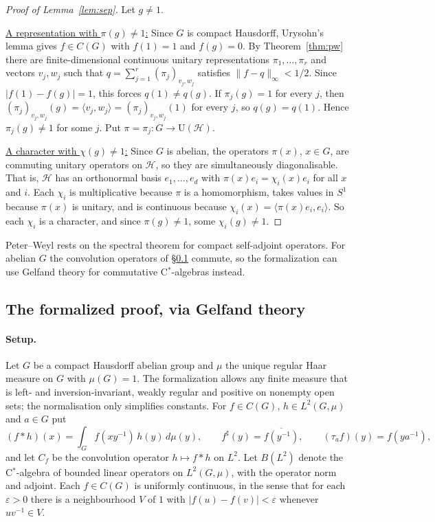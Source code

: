 \documentclass[11pt]{article}
\begin{document}
\begin{proof}[Proof of Lemma~\ref{lem:sep}]
Let $g \neq 1$.

\uline{A representation with $\pi(g) \neq 1$:} Since $G$ is compact Hausdorff, Urysohn's lemma gives $f \in C(G)$ with $f(1) = 1$ and $f(g) = 0$. By Theorem~\ref{thm:pw} there are finite-dimensional continuous unitary representations $\pi_1, \dots, \pi_r$ and vectors $v_j, w_j$ such that $q = \sum_{j=1}^r (\pi_j)_{v_j,w_j}$ satisfies $\|f - q\|_\infty < 1/2$. Since $|f(1) - f(g)| = 1$, this forces $q(1) \neq q(g)$.
If $\pi_j(g) = 1$ for every $j$, then $(\pi_j)_{v_j,w_j}(g) = \langle v_j, w_j\rangle = (\pi_j)_{v_j,w_j}(1)$ for every $j$, so $q(g) = q(1)$. Hence $\pi_j(g) \neq 1$ for some $j$. Put $\pi = \pi_j\colon G \to \mathrm{U}(\mathcal{H})$.

\uline{A character with $\chi(g) \neq 1$:} Since $G$ is abelian, the operators $\pi(x)$, $x \in G$, are commuting unitary operators on $\mathcal{H}$, so they are simultaneously diagonalisable. That is, $\mathcal{H}$ has an orthonormal basis $e_1, \dots, e_d$ with $\pi(x)e_i = \chi_i(x)e_i$ for all $x$ and $i$. Each $\chi_i$ is multiplicative because $\pi$ is a homomorphism, takes values in $S^1$ because $\pi(x)$ is unitary, and is continuous because $\chi_i(x) = \langle \pi(x)e_i, e_i\rangle$. So each $\chi_i$ is a character, and since $\pi(g) \neq 1$, some $\chi_i(g) \neq 1$.
\end{proof}

Peter--Weyl rests on the spectral theorem for compact self-adjoint operators. For abelian $G$ the convolution operators of \S\ref{sec:gelfand} commute, so the formalization can use Gelfand theory for commutative C$^*$-algebras instead.

\subsection{The formalized proof, via Gelfand theory}\label{sec:gelfand}

\paragraph{Setup.} Let $G$ be a compact Hausdorff abelian group and $\mu$ the unique regular Haar measure on $G$ with $\mu(G) = 1$. The formalization allows any finite measure that is left- and inversion-invariant, weakly regular and positive on nonempty open sets; the normalisation only simplifies constants. For $f \in C(G)$, $h \in L^2(G, \mu)$ and $a \in G$ put
\[
  (f * h)(x) = \int_G f(xy^{-1})\,h(y)\,d\mu(y), \qquad
  f^\sharp(y) = \overline{f(y^{-1})}, \qquad
  (\tau_a f)(y) = f(ya^{-1}),
\]
and let $C_f$ be the convolution operator $h \mapsto f * h$ on $L^2$. Let $B(L^2)$ denote the C$^*$-algebra of bounded linear operators on $L^2(G, \mu)$, with the operator norm and adjoint. Each $f \in C(G)$ is uniformly continuous, in the sense that for each $\varepsilon > 0$ there is a neighbourhood $V$ of $1$ with $|f(u) - f(v)| < \varepsilon$ whenever $uv^{-1} \in V$.
\end{document}
